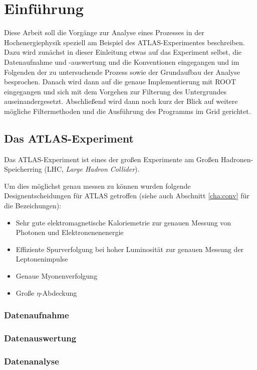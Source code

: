 \section{Einführung}
Diese Arbeit soll die Vorgänge zur Analyse eines Prozesses in der
Hochenergiephysik speziell am Beispiel des ATLAS-Experimentes beschreiben.  Dazu
wird zunächst in dieser Einleitung etwas auf das Experiment selbst, die
Datenaufnahme und -auswertung und die Konventionen eingegangen und im Folgenden
der zu untersuchende Prozess sowie der Grundaufbau der Analyse besprochen.
Danach wird dann auf die genaue Implementierung mit ROOT eingegangen und sich
mit dem Vorgehen zur Filterung des Untergrundes auseinandergesetzt. Abschließend
wird dann noch kurz der Blick auf weitere mögliche Filtermethoden und die
Ausführung des Programms im Grid gerichtet.

\subsection{Das ATLAS-Experiment}
Das ATLAS-Experiment ist eines der großen Experimente am Großen
Hadronen-Speicherring (LHC, \emph{Large Hadron Collider}).

Um dies möglichst genau messen zu können wurden folgende Designentscheidungen
für ATLAS getroffen\cite{atlas-tp} (siehe auch Abschnitt \ref{cha:conv} für die
Bezeichungen):
\begin{itemize}
  \item Sehr gute elektromagnetische Kaloriemetrie zur genauen Messung von
    Photonen und Elektronenenenergie
  \item Effiziente Spurverfolgung bei hoher Luminosität zur genauen Messung der
    Leptonenimpulse
  \item Genaue Myonenverfolgung
  \item Große $\eta$-Abdeckung 
\end{itemize}

\subsubsection{Datenaufnahme}
\subsubsection{Datenauswertung}
\subsubsection{Datenanalyse}

